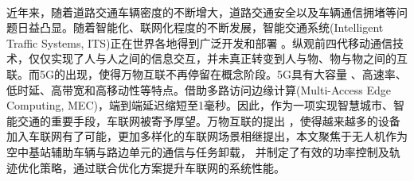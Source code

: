 \makeatletter
{}
  \pagestyle{fancy}%
  \fancyhf{}
\makeatother
\newpage\ \vspace{-2.5em}
\begin{center}
\vspace{0.4cm}   %
\makeatletter
{}  %
\makeatother
\end{center}
\vspace{0.7cm}   %
近年来，随着道路交通车辆密度的不断增大，道路交通安全以及车辆通信拥堵等问题日益凸显。随着智能化、联网化程度的不断发展，智能交通系统(Intelligent Traffic Systems, ITS)正在世界各地得到广泛开发和部署
。纵观前四代移动通信技术，仅仅实现了人与人之间的信息交互，并未真正转变到人与物、物与物之间的互联。而5G的出现，使得万物互联不再停留在概念阶段。5G具有大容量
、高速率、低时延、高带宽和高移动性等特点。借助多路访问边缘计算(Multi-Access Edge Computing, MEC)，端到端延迟缩短至1毫秒。因此，作为一项实现智慧城市、智能交通的重要手段，车联网被寄予厚望。万物互联的提出
，使得越来越多的设备加入车联网有了可能，更加多样化的车联网场景相继提出，本文聚焦于无人机作为空中基站辅助车辆与路边单元的通信与任务卸载，
并制定了有效的功率控制及轨迹优化策略，通过联合优化方案提升车联网的系统性能。

